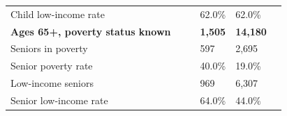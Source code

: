 \documentclass[9pt]{report}
\begin{document}
\begin{tabular}{p{.10in}p{.10in}p{.10in}p{3.7in}>{\hfill}p{.85in}>{\hfill}p{.85in}>{\hfill}p{.85in}>{\hfill}p{.85in}p{0.1in}}
\multicolumn{4}{l}{\parbox{3.6in}{\strut\raggedright{{Child low-income rate}}\strut}} &  &  & 62.0\% & 62.0\% & \multicolumn{1}{l}{}  \\ 
\multicolumn{4}{l}{\parbox{3.5in}{\strut\raggedright{\textbf{Ages 65+, poverty status known}\strut}}} & \textbf{} & \textbf{} & \textbf{1,505} & \textbf{14,180} & \textbf{} \\ 
\multicolumn{4}{l}{\parbox{3.6in}{\strut\raggedright{{Seniors in poverty}}\strut}} &  &  & 597 & 2,695 & \multicolumn{1}{l}{}  \\ 
\multicolumn{4}{l}{\parbox{3.6in}{\strut\raggedright{{Senior poverty rate}}\strut}} &  &  & 40.0\% & 19.0\% & \multicolumn{1}{l}{}  \\ 
\multicolumn{4}{l}{\parbox{3.6in}{\strut\raggedright{{Low-income seniors}}\strut}} &  &  & 969 & 6,307 & \multicolumn{1}{l}{}  \\ 
\multicolumn{4}{l}{\parbox{3.6in}{\strut\raggedright{{Senior low-income rate}}\strut}} &  &  & 64.0\% & 44.0\% & \multicolumn{1}{l}{}  \\ 

\end{tabular}
\setlength{\tabcolsep}{6pt} %
\end{document}
